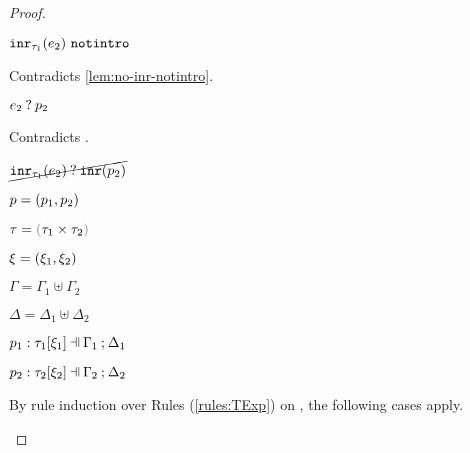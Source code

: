 \begin{proof}
\begin{byCases}
\begin{byCases}
\begin{byCases}
            \begin{byCases}
            \item[\text{(\ref{rule:MMNotIntro})}]
                \begin{pfsteps*}
                \item $\mathtt{inr}_{\tau_1}({e_2}) ~\mathtt{notintro}$ 
                \end{pfsteps*}
                Contradicts \autoref{lem:no-inr-notintro}.
            \item[\text{(\ref{rule:MMInr})}]
                \begin{pfsteps*}
                \item $e_2 \mathbin{?} p_2$ 
                \end{pfsteps*}
                Contradicts .
            \end{byCases}
            \begin{pfsteps*}
            \item $\cancel{\mathtt{inr}_{\tau_1}({e_2}) \mathbin{?} \mathtt{inr}(p_2)}$ 
            \end{pfsteps*}
        \end{byCases}
    \end{byCases}
\item[\text{(\ref{rule:PTPair})}]
    \begin{pfsteps*}
    \item $p=(p_1 , p_2)$ 
    \item $\tau=\tprod{\tau_1}{\tau_2}$ 
    \item $\xi=(\xi_1 , \xi_2)$ 
    \item $\Gamma=\Gamma_1 \uplus \Gamma_2$ 
    \item $\Delta=\Delta_1 \uplus \Delta_2$ 
    \item $\chpattyp{p_1}{\tau_1}{\xi_1}{\Gamma_1}{\Delta_1}$  
    \item $\chpattyp{p_2}{\tau_2}{\xi_2}{\Gamma_2}{\Delta_2}$  
    \end{pfsteps*}
    By rule induction over Rules (\ref{rules:TExp}) on , the following cases apply.
    \begin{byCases}
    \item[\text{(\ref{rule:TEHole}),(\ref{rule:THole}),(\ref{rule:TAp}),(\ref{rule:TPrl}),(\ref{rule:TPrr}),(\ref{rule:TMatchZPre}),(\ref{rule:TMatchNZPre})}]

\end{byCases}
\end{byCases}
\end{proof}
